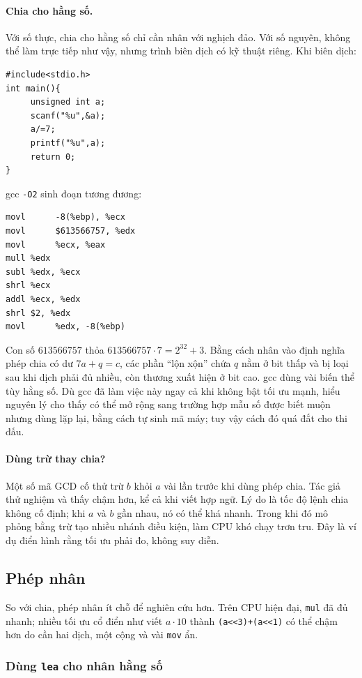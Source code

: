 \documentclass[11pt]{article}
\begin{document}
\paragraph{Chia cho hằng số.}
Với số thực, chia cho hằng số chỉ cần nhân với nghịch đảo. Với số nguyên,
không thể làm trực tiếp như vậy, nhưng trình biên dịch có kỹ thuật riêng. Khi
biên dịch:
\begin{verbatim}
#include<stdio.h>
int main(){
     unsigned int a;
     scanf("%u",&a);
     a/=7;
     printf("%u",a);
     return 0;
}
\end{verbatim}
gcc \texttt{-O2} sinh đoạn tương đương:
\begin{verbatim}
movl      -8(%ebp), %ecx
movl      $613566757, %edx
movl      %ecx, %eax
mull %edx
subl %edx, %ecx
shrl %ecx
addl %ecx, %edx
shrl $2, %edx
movl      %edx, -8(%ebp)
\end{verbatim}

Con số \(613566757\) thỏa \(613566757\cdot 7=2^{32}+3\). Bằng cách nhân vào
định nghĩa phép chia có dư \(7a+q=c\), các phần ``lộn xộn'' chứa \(q\) nằm ở
bit thấp và bị loại sau khi dịch phải đủ nhiều, còn thương xuất hiện ở bit
cao. gcc dùng vài biến thể tùy hằng số. Dù gcc đã làm việc này ngay cả khi
không bật tối ưu mạnh, hiểu nguyên lý cho thấy có thể mở rộng sang trường hợp
mẫu số được biết muộn nhưng dùng lặp lại, bằng cách tự sinh mã máy; tuy vậy
cách đó quá đắt cho thi đấu.

\paragraph{Dùng trừ thay chia?}
Một số mã GCD cố thử trừ \(b\) khỏi \(a\) vài lần trước khi dùng phép chia.
Tác giả thử nghiệm và thấy chậm hơn, kể cả khi viết hợp ngữ. Lý do là tốc độ
lệnh chia không cố định; khi \(a\) và \(b\) gần nhau, nó có thể khá nhanh.
Trong khi đó mô phỏng bằng trừ tạo nhiều nhánh điều kiện, làm CPU khó chạy
trơn tru. Đây là ví dụ điển hình rằng tối ưu phải đo, không suy diễn.

\subsection{Phép nhân}

So với chia, phép nhân ít chỗ để nghiên cứu hơn. Trên CPU hiện đại,
\texttt{mul} đã đủ nhanh; nhiều tối ưu cổ điển như viết \(a\cdot 10\) thành
\texttt{(a<<3)+(a<<1)} có thể chậm hơn do cần hai dịch, một cộng và vài
\texttt{mov} ẩn.

\subsubsection{Dùng \texttt{lea} cho nhân hằng số}
\end{document}
